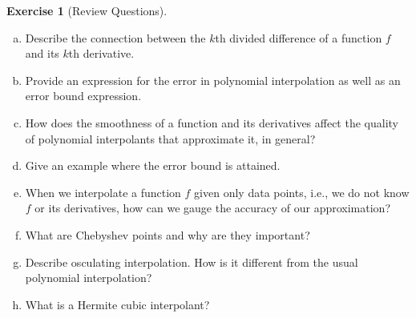 \documentclass[12pt,a4]{article}
\theoremstyle{definition}
\newtheorem{exercise}{Exercise}
\begin{document}
\begin{exercise}[Review Questions]
\begin{enumerate}[(a)]
		\item Describe the connection between the $k$th divided difference of a function $f$ and its $k$th derivative.
		
		\item Provide an expression for the error in polynomial interpolation as well as an error bound expression.
		
		\item How does the smoothness of a function and its derivatives affect the quality of polynomial interpolants that approximate it, in general?
		
		\item Give an example where the error bound is attained. 
		
		\item When we interpolate a function $f$ given only data points, i.e., we do not know $f$ or its derivatives, how can we gauge the accuracy of our approximation?
		
		\item What are Chebyshev points and why are they important?
		
		\item Describe osculating interpolation. How is it different from the usual polynomial interpolation?
		
		\item What is a Hermite cubic interpolant?
		
	\end{enumerate}
\end{exercise}
\end{document}
